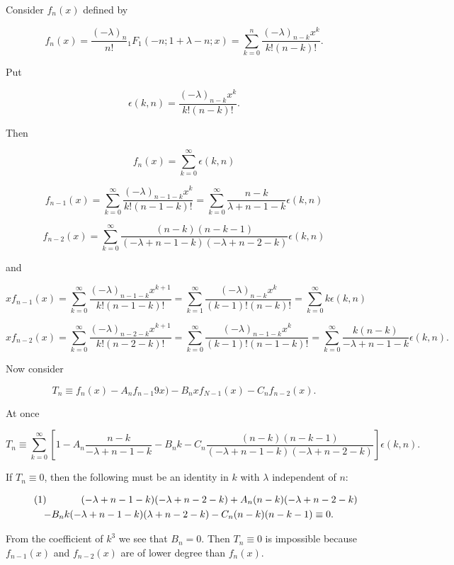 \begin{solution}
Consider $f_n(x)$ defined by

$$f_n(x) = \dfrac{(-\lambda)_n}{n!} {}_1F_1(-n; 1+\lambda-n;x) = \displaystyle\sum_{k=0}^n \dfrac{(-\lambda)_{n-k}x^k}{k!(n-k)!}.$$

Put

$$\epsilon(k,n) = \dfrac{(-\lambda)_{n-k} x^k}{k! (n-k)!}.$$

Then

$$f_n(x) = \displaystyle\sum_{k=0}^{\infty} \epsilon(k,n)$$

$$f_{n-1}(x) = \displaystyle\sum_{k=0}^{\infty} \dfrac{(-\lambda)_{n-1-k} x^k}{k! (n-1-k)!} = \displaystyle\sum_{k=0}^{\infty} \dfrac{n-k}{\lambda+n-1-k} \epsilon(k,n)$$

$$f_{n-2}(x) = \displaystyle\sum_{k=0}^{\infty} \dfrac{(n-k)(n-k-1)}{(-\lambda + n-1-k)(-\lambda+n-2-k)}\epsilon(k,n)$$

and

$$x f_{n-1}(x) = \displaystyle\sum_{k=0}^{\infty} \dfrac{(-\lambda)_{n-1-k}x^{k+1}}{k!(n-1-k)!} = \displaystyle\sum_{k=1}^{\infty} \dfrac{(-\lambda)_{n-k}x^k}{(k-1)!(n-k)!} = \displaystyle\sum_{k=0}^{\infty} k \epsilon(k,n)$$

$$x f_{n-2}(x) = \displaystyle\sum_{k=0}^{\infty} \dfrac{(-\lambda)_{n-2-k} x^{k+1}}{k!(n-2-k)!} = \displaystyle\sum_{k=0}^{\infty} \dfrac{(-\lambda)_{n-1-k} x^k}{(k-1)! (n-1-k)!} = \displaystyle\sum_{k=0}^{\infty} \dfrac{k(n-k)}{-\lambda + n-1-k} \epsilon(k,n).$$

Now consider

$$T_n \equiv f_n(x) - A_n f_{n-1}9x) - B_nx f_{N-1}(x) - C_n f_{n-2}(x).$$

At once

$$T_n \equiv \displaystyle\sum_{k=0}^{\infty} \left[ 1 - A_n \dfrac{n-k}{-\lambda+n-1-k} - B_nk - C_n \dfrac{(n-k)(n-k-1)}{(-\lambda+n-1-k)(-\lambda+n-2-k)} \right] \epsilon(k,n).$$

If $T_n \equiv 0$, then the following must be an identity in $k$ with $\lambda$ independent of $n$:

\begin{eqnarray*}
\lefteqn{(1) \hspace{35pt}(-\lambda+n-1-k)(-\lambda+n-2-k)+A_n(n-k)(-\lambda+n-2-k) } \\
&& - B_nk(-\lambda+n-1-k)(\lambda+n-2-k)-C_n(n-k)(n-k-1) \equiv 0.
\end{eqnarray*}

From the coefficient of $k^3$ we see that $B_n=0$. Then $T_n \equiv 0$ is impossible because $f_{n-1}(x)$ and $f_{n-2}(x)$ are of lower degree than $f_n(x).$


\end{solution}
